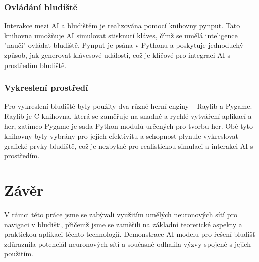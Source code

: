 \documentclass[12pt, a4paper,
twoside,        %
openright
]{report}
\begin{document}
\subsection{Ovládání bludiště}
Interakce mezi AI a bludištěm je realizována pomocí knihovny pynput. Tato knihovna umožňuje AI simulovat stisknutí kláves, čímž se umělá inteligence "naučí" ovládat bludiště. Pynput je psána v Pythonu a poskytuje jednoduchý způsob, jak generovat klávesové události, což je klíčové pro integraci AI s prostředím bludiště.

\subsection{Vykreslení prostředí}
Pro vykreslení bludiště byly použity dva různé herní enginy – Raylib a Pygame. Raylib je C knihovna, která se zaměřuje na snadné a rychlé vytváření aplikací a her, zatímco Pygame je sada Python modulů určených pro tvorbu her. Obě tyto knihovny byly vybrány pro jejich efektivitu a schopnost plynule vykreslovat grafické prvky bludiště, což je nezbytné pro realistickou simulaci a interakci AI s prostředím.





	
	\chapter*{Závěr}
	
	V rámci této práce jsme se zabývali využitím umělých neuronových sítí pro navigaci v bludišti, přičemž jsme se zaměřili na základní teoretické aspekty a praktickou aplikaci těchto technologií. Demonstrace AI modelu pro řešení bludišť zdůraznila potenciál neuronových sítí a současně odhalila výzvy spojené s jejich použitím.
	
\end{document}
